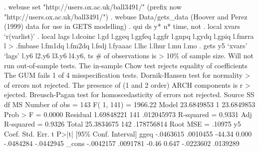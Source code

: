 {\smallskip}
. webuse set "http://users.ox.ac.uk/{\tytilde}ball3491/"
(prefix now "http://users.ox.ac.uk/{\tytilde}ball3491/")
{\smallskip}
. webuse Data/gets_data
(Hoover and Perez (1999) data for use in GETS modelling)
{\smallskip}
. qui ds y* u* time, not
{\smallskip}
. local xvars `r(varlist)' 
{\smallskip}
. local lags l.dcoinc l.gd l.ggeq l.ggfeq l.ggfr l.gnpq l.gydq l.gpiq l.fmrra l
> .fmbase l.fm1dq l.fm2dq l.fsdj l.fyaaac l.lhc l.lhur l.mu l.mo 
{\smallskip}
. gets y5 `xvars' `lags' l.y6 l2.y6 l3.y6 l4.y6, ts
\# of observations is > 10\% of sample size.  Will not run out-of-sample tests.
The in-sample Chow test rejects equality of coefficients
{\smallskip}
The GUM fails 1 of 4 misspecification tests.  Dornik-Hansen test for normality 
> of errors not rejected.  The presence of (1 and 2 order) ARCH components is r
> ejected. Breusch-Pagan test for homoscedasticity of errors not rejected.
{\smallskip}
{\smallskip}
      Source {\VBAR}       SS       df       MS              Number of obs =     143
           F(  1,   141) = 1966.22
       Model {\VBAR}  23.6849853     1  23.6849853           Prob > F      =  0.0000
    Residual {\VBAR}  1.69848221   141  .012045973           R-squared     =  0.9331
           Adj R-squared =  0.9326
       Total {\VBAR}  25.3834675   142  .178756814           Root MSE      =  .10975
{\smallskip}
          y5 {\VBAR}      Coef.   Std. Err.      t    P>|t|     [95\% Conf. Interval]
        ggeq {\VBAR}  -.0463615   .0010455   -44.34   0.000    -.0484284   -.0442945
       _cons {\VBAR}  -.0042157   .0091781    -0.46   0.647    -.0223602    .0139289

